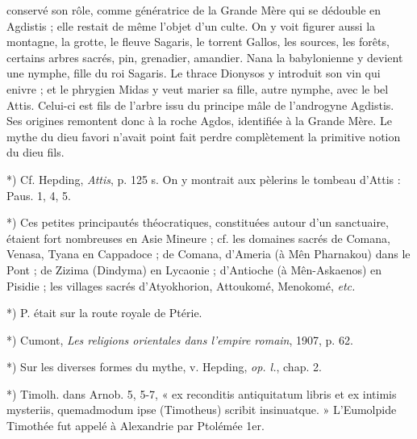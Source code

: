\documentclass[a4paper, 11pt, oneside, polutonikogreek, french]{article}
\begin{document}
conservé son rôle, comme génératrice de la Grande Mère qui se dédouble en Agdistis ; elle restait de même l'objet d'un culte. On y voit figurer aussi la montagne, la grotte, le fleuve Sagaris, le torrent Gallos, les sources, les forêts, certains arbres sacrés, pin, grenadier, amandier. Nana la babylonienne y devient une nymphe, fille du roi Sagaris. Le thrace Dionysos y introduit son vin qui enivre ; et le phrygien Midas y veut marier sa fille, autre nymphe, avec le bel Attis. Celui-ci est fils de l'arbre issu du principe mâle de l'androgyne Agdistis. Ses origines remontent donc à la roche Agdos, identifiée à la Grande Mère. Le mythe du dieu favori n'avait point fait perdre complètement la primitive notion du dieu fils.

*) Cf. Hepding, \emph{Attis}, p. 125 s. On y montrait aux pèlerins le tombeau d'Attis : Paus. 1, 4, 5.

*) Ces petites principautés théocratiques, constituées autour d'un sanctuaire, étaient fort nombreuses en Asie Mineure ; cf. les domaines sacrés de Comana, Venasa, Tyana en Cappadoce ; de Comana, d'Ameria (à Mên Pharnakou) dans le Pont ; de Zizima (Dindyma) en Lycaonie ; d'Antioche (à Mên-Askaenos) en Pisidie ; les villages sacrés d'Atyokhorion, Attoukomé, Menokomé, \emph{etc.}

*) P. était sur la route royale de Ptérie.

*) Cumont, \emph{Les religions orientales dans l'empire romain}, 1907, p. 62.

*) Sur les diverses formes du mythe, v. Hepding, \emph{op. l.}, chap. 2.

*) Timolh. dans Arnob. 5, 5-7, « ex reconditis antiquitatum libris et ex intimis mysteriis, quemadmodum ipse (Timotheus) scribit insinuatque. » L'Eumolpide Timothée fut appelé à Alexandrie par Ptolémée 1er.
\end{document}
